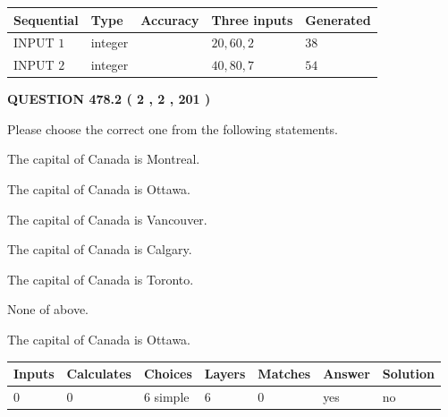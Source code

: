 \documentclass[12pt]{article}
\begin{document}
  
\noindent\begin{tabular}{|l|l|l|l|l|}
\hline
 Sequential & Type & Accuracy & Three inputs & Generated \\ 
\hline
 
 
  INPUT $  1 $ & integer &  & $
 20
 , 
 60
 , 
 2
 $ & $ 38 $ 
 \\  \hline  
 
 
  INPUT $  2 $ & integer &  & $
 40
 , 
 80
 , 
 7
 $ & $ 54 $ 
 \\  \hline  
 \end{tabular}
   
   
  
\vspace{0.2in}
  
{\textbf{\Large{QUESTION
478.2 
 ( 2 , 2 , 201 )
}}}
  
  
Please choose the correct one from the following statements.
 
 
The capital of Canada is Montreal.
 
 
The capital of Canada is Ottawa.
 
 
The capital of Canada is Vancouver.
 
 
The capital of Canada is Calgary.
 
 
The capital of Canada is Toronto.
 
 
 None of above.
 
 
\noindent{}
 
 
The capital of Canada is Ottawa.
 
 
\noindent{}
 
 
   
   
   
   
\noindent\begin{tabular}{|l|l|l|l|l|l|l|}
 \hline
Inputs & Calculates & Choices & Layers & Matches & Answer & Solution \\ \hline
 0  & 
 0  & 
 6
  simple  
  & 
 6  & 
 0  & 
  yes & 
  no 
  \\ \hline
 \end{tabular}
   
   
   
\end{document}
